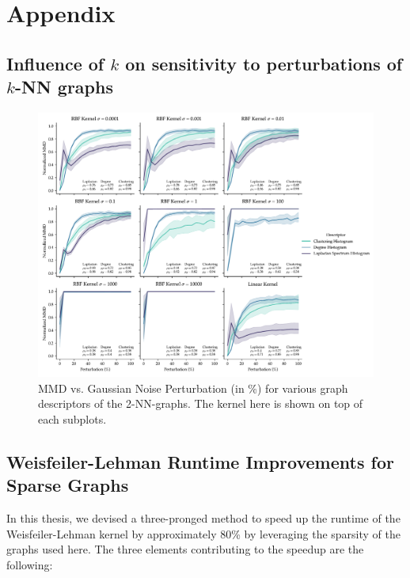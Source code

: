 \chapter{Appendix}
\vspace{12pt}
\section{Influence of $k$ on sensitivity to perturbations of $k$-NN graphs}

\begin{figure}[h]
  \centering
  \includegraphics[width=\textwidth]{./figures/results/res_1_5.pdf}
  \caption[MMD vs. Gaussian Noise Perturbation (in \%) for various graph
descriptors of the 2-NN-graphs.]{MMD vs. Gaussian Noise Perturbation (in \%) for
various graph descriptors of the 2-NN-graphs. The kernel here is shown on top of
each subplots.}
  \label{fig:mmd_effect_kernel_knn}
\end{figure}


\section{Weisfeiler-Lehman Runtime Improvements for Sparse
  Graphs}\label{sec:sparse_wl}

In this thesis, we devised a three-pronged method to speed up the runtime of the
Weisfeiler-Lehman kernel by approximately 80\% by leveraging the sparsity of the
graphs used here. The three elements contributing to the speedup are the
following:

